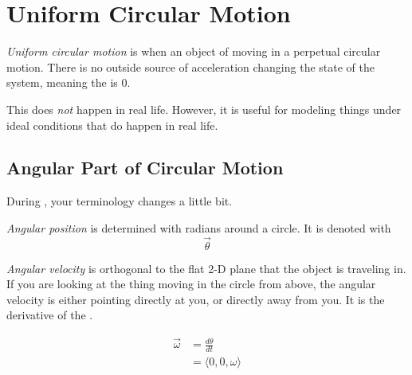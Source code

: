 \section{Uniform Circular Motion}\label{sec:Uniform Circular Motion}
\begin{definition}\label{def:Uniform Circular Motion}
  \emph{Uniform circular motion} is when an object of moving in a perpetual circular motion.
  There is no outside source of acceleration changing the state of the system, meaning the  is $0$.
  \begin{remark}
    This does \emph{not} happen in real life.
    However, it is useful for modeling things under ideal conditions that do happen in real life.
  \end{remark}
\end{definition}

\subsection{Angular Part of Circular Motion}\label{subsec:Angular Circular Motion}
During , your terminology changes a little bit.
\begin{definition}\label{def:Angular Position}
  \emph{Angular position} is determined with radians around a circle.
  It is denoted with \[ \vec{\theta} \]
\end{definition}

\begin{definition}\label{def:Angular Velocity}
  \emph{Angular velocity} is orthogonal to the flat 2-D plane that the object is traveling in.
  If you are looking at the thing moving in the circle from above, the angular velocity is either pointing directly at you, or directly away from you.
  It is the derivative of the .

  \begin{equation}\label{eq:Angular Velocity}
    \begin{aligned}
      \vec{\omega} &= \frac{d \theta}{dt} \\
      &= \langle 0, 0, \omega \rangle \\
    \end{aligned}
  \end{equation}
\end{definition}

